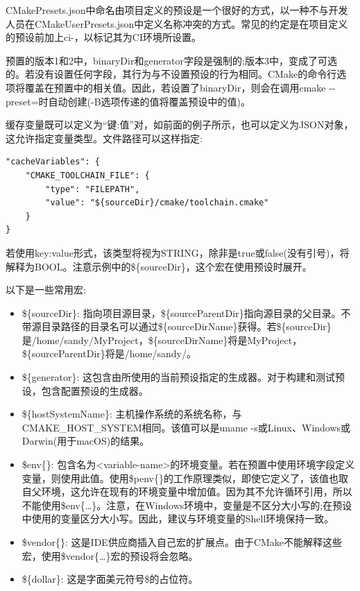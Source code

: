 \begin{tcolorbox}[colback=blue!5!white,colframe=blue!75!black,title=预设的命名约定]
CMakePresets.json中命名由项目定义的预设是一个很好的方式，以一种不与开发人员在CMakeUserPresets.json中定义名称冲突的方式。常见的约定是在项目定义的预设前加上ci-，以标记其为CI环境所设置。
\end{tcolorbox}

预置的版本1和2中，binaryDir和generator字段是强制的;版本3中，变成了可选的。若没有设置任何字段，其行为与不设置预设的行为相同。CMake的命令行选项将覆盖在预置中的相关值。因此，若设置了binaryDir，则会在调用cmake -{}-preset=时自动创建(-B选项传递的值将覆盖预设中的值)。

缓存变量既可以定义为“键:值”对，如前面的例子所示，也可以定义为JSON对象，这允许指定变量类型。文件路径可以这样指定:

\begin{lstlisting}[style=styleCMake]
"cacheVariables": {
	"CMAKE_TOOLCHAIN_FILE": {
		"type": "FILEPATH",
		"value": "${sourceDir}/cmake/toolchain.cmake"
	}
}
\end{lstlisting}

若使用key:value形式，该类型将视为STRING，除非是true或false(没有引号)，将解释为BOOL。注意示例中的\$\{sourceDir\}，这个宏在使用预设时展开。

以下是一些常用宏:

\begin{itemize}
\item 
\$\{sourceDir\}: 指向项目源目录，\$\{sourceParentDir\}指向源目录的父目录。不带源目录路径的目录名可以通过\$\{sourceDirName\}获得。若\$\{sourceDir\}是/home/sandy/MyProject，\$\{sourceDirName\}将是MyProject， \$\{sourceParentDir\}将是/home/sandy/。

\item 
\$\{generator\}: 这包含由所使用的当前预设指定的生成器。对于构建和测试预设，包含配置预设的生成器。

\item 
\$\{hostSystemName\}: 主机操作系统的系统名称，与CMAKE\_HOST\_SYSTEM相同。该值可以是uname -s或Linux、Windows或Darwin(用于macOS)的结果。

\item
\$env\{<variable-name>\}: 包含名为<variable-name>的环境变量。若在预置中使用环境字段定义变量，则使用此值。使用\$penv\{<variable-name>\}的工作原理类似，即使它定义了，该值也取自父环境，这允许在现有的环境变量中增加值。因为其不允许循环引用，所以不能使用\$env\{…\}。注意，在Windows环境中，变量是不区分大小写的;在预设中使用的变量区分大小写。因此，建议与环境变量的Shell环境保持一致。

\item
\$vendor\{<macro-name>\}: 这是IDE供应商插入自己宏的扩展点。由于CMake不能解释这些宏，使用\$vendor\{…\}宏的预设将会忽略。

\item
\$\{dollar\}: 这是字面美元符号\$的占位符。
\end{itemize}


